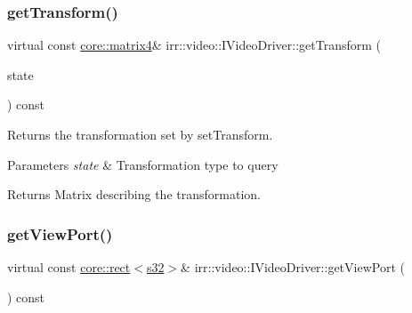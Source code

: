 \subsubsection{\texorpdfstring{get\+Transform()}{getTransform()}\hspace{0.1cm}{\footnotesize\ttfamily [2/2]}}
{\footnotesize\ttfamily virtual const \hyperlink{namespaceirr_1_1core_a4c9d4e29899535971052810954a14431}{core\+::matrix4}\& irr\+::video\+::\+I\+Video\+Driver\+::get\+Transform (\begin{DoxyParamCaption}\item[{\hyperlink{namespaceirr_1_1video_a15b57657a320243be03ae6f66fcff43d}{E\+\_\+\+T\+R\+A\+N\+S\+F\+O\+R\+M\+A\+T\+I\+O\+N\+\_\+\+S\+T\+A\+TE}}]{state }\end{DoxyParamCaption}) const\hspace{0.3cm}{\ttfamily [pure virtual]}}



Returns the transformation set by set\+Transform. 


\begin{DoxyParams}{Parameters}
{\em state} & Transformation type to query \\
\hline
\end{DoxyParams}
\begin{DoxyReturn}{Returns}
Matrix describing the transformation. 
\end{DoxyReturn}
\mbox{\label{classirr_1_1video_1_1IVideoDriver_aa21810374736559e937fcad30ac699b4}} 
\subsubsection{\texorpdfstring{get\+View\+Port()}{getViewPort()}\hspace{0.1cm}{\footnotesize\ttfamily [1/2]}}
{\footnotesize\ttfamily virtual const \hyperlink{classirr_1_1core_1_1rect}{core\+::rect}$<$\hyperlink{namespaceirr_ac66849b7a6ed16e30ebede579f9b47c6}{s32}$>$\& irr\+::video\+::\+I\+Video\+Driver\+::get\+View\+Port (\begin{DoxyParamCaption}{ }\end{DoxyParamCaption}) const\hspace{0.3cm}{\ttfamily [pure virtual]}}



